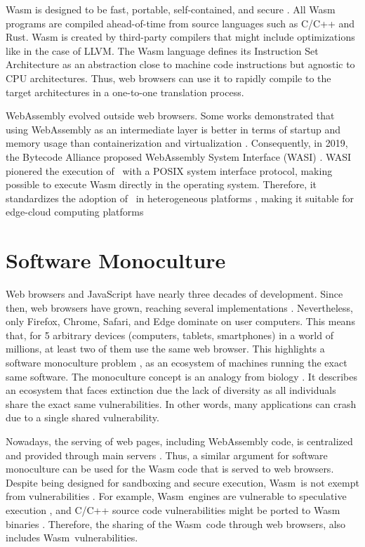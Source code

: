 {%
Wasm is designed to be fast, portable, self-contained, and secure \cite{Haas_2017}.
All Wasm programs are compiled ahead-of-time from source languages such as C/C++ and Rust.
Wasm is created by third-party compilers that might include optimizations like in the case of LLVM.  
The Wasm language defines its Instruction Set Architecture \cite{wasm_spec} as an abstraction close to machine code instructions but agnostic to CPU architectures. Thus,  web browsers can use it to rapidly compile to the target architectures in a one-to-one translation process.

WebAssembly evolved outside web browsers.
Some works demonstrated that using WebAssembly as an intermediate layer is better in terms of startup and memory usage than containerization and virtualization \cite{pMendkiServerless, 1244493Jacobsson}. 
Consequently, in 2019, the Bytecode Alliance \cite{bytecodealliance} proposed WebAssembly System Interface (WASI) \cite{WASI}. 
WASI pionered the execution of \wasm\ with a POSIX system interface protocol, making possible to execute Wasm directly in the operating system. 
Therefore, it standardizes the adoption of \wasm\ in heterogeneous platforms \cite{bryant2020webassembly}, making it suitable for edge-cloud computing platforms \cite{9640153, wen2020wasmachine}

\section{Software Monoculture}
Web browsers and JavaScript have nearly three decades of development.
Since then, web browsers have grown, reaching several implementations \cite{grosskurth2005reference, GARCES2021111004}. 
Nevertheless, only Firefox, Chrome, Safari, and Edge dominate on user computers.
This means that, for 5 arbitrary devices (computers, tablets, smartphones) in a world of millions, at least two of them use the same web browser.
This highlights a software monoculture problem \cite{goth2003addressing}, as an ecosystem of machines running the exact same software. 
The monoculture concept is an analogy from biology \cite{lala2009monoculture}. 
It describes an ecosystem that faces extinction due the lack of diversity as all individuals share the exact same vulnerabilities.
In other words, many applications can crash due to a single shared vulnerability.


\renewcommand{\wasm}{Wasm}

Nowadays, the serving of web pages, including WebAssembly code, is centralized and provided through main servers \cite{STRAC}.
Thus, a similar argument for software monoculture can be used for the Wasm code that is served to web browsers. 
Despite being designed for sandboxing and secure execution, \wasm\ is not exempt from vulnerabilities \cite{WebAssemblySecurity}.
For example, \wasm\ engines are vulnerable to speculative execution \cite{Narayan2021Swivel}, and C/C++ source code vulnerabilities might be ported to Wasm binaries \cite{DeRoover2022}.  
Therefore, the sharing of the \wasm\ code through web browsers, also includes \wasm\ vulnerabilities.


}
